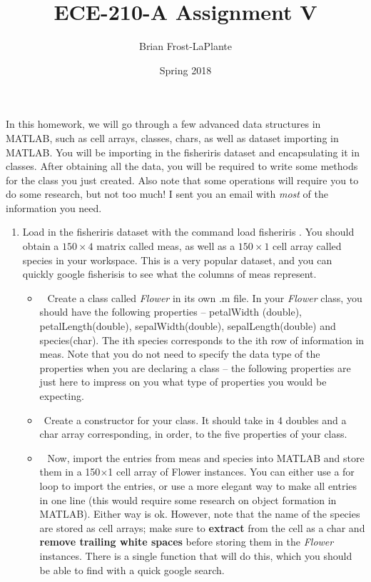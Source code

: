 \documentclass{article}
\title{ECE-210-A Assignment V}
\author{Brian Frost-LaPlante}
\date{Spring 2018}
\begin{document}
\maketitle
\noindent In this homework, we will go through a few advanced data structures in MATLAB, such as cell arrays, classes, chars, as well as dataset importing in MATLAB. You will be importing in the fisheriris dataset and encapsulating it in classes. After obtaining all the data, you will be required to write some methods for the class you just created. Also note that some operations will require you to do some research, but not too much! I sent you an email with \textit{most} of the information you need.

\begin{enumerate}[leftmargin=0cm,itemindent=.5cm,labelwidth=\itemindent,labelsep=0cm,align=left,label=\textbf{\arabic*.}]
\item  Load in the fisheriris dataset with the command load fisheriris . You should obtain a $150 \times 4$ matrix called meas, as well as a $150 \times 1$ cell array called species in your workspace. This is a very popular dataset, and you can quickly google fisherisis to see what the columns of meas represent. 
	\begin{itemize}
		\item $\:\:$  Create a class called \textit{Flower} in its own .m file. In your \textit{Flower} class, you should have the following properties -- petalWidth (double), petalLength(double), sepalWidth(double), sepalLength(double) and species(char). The ith species corresponds to the ith row of information in meas. Note that you do not need to specify the data type of the properties when you are declaring a class – the following properties are just here to impress on you what type of properties you would be expecting. 
		
		\item $\:\:$Create a constructor for your class. It should take in 4 doubles and a char array corresponding, in order, to the five properties of your class.
		
		\item $\:\:$ Now, import the entries from meas and species into MATLAB and store them in a 150$\times$1 cell array of Flower instances. You can either use a for loop to import the entries, or use a more elegant way to make all entries in one line (this would require some research on object formation in MATLAB). Either way is ok. However, note that the name of the species are stored as cell arrays; make sure to \textbf{extract} from the cell as a char and \textbf{remove trailing white spaces} before storing them in the \textit{Flower} instances. There is a single function that will do this, which you should be able to find with a quick google search.


\end{itemize}
\end{enumerate}
\end{document}
